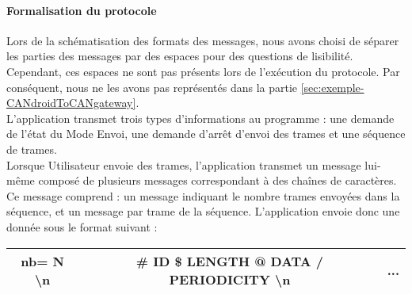 \paragraph{Formalisation du protocole}
\label{sec:formalisation-protocole-CANdroidToCANgateway}

Lors de la schématisation des formats des messages, nous avons choisi de séparer les parties des messages par des espaces pour des questions de lisibilité. Cependant, ces espaces ne sont pas présents lors de l'exécution du protocole. Par conséquent, nous ne les avons pas représentés dans la partie \ref{sec:exemple-CANdroidToCANgateway}.\\

L'application {\nomApplication} transmet trois types d'informations au programme {\nomLogiciel} : une demande de l'état du Mode Envoi, une demande d'arrêt d'envoi des trames et une séquence de trames.\\

Lorsque Utilisateur envoie des trames, l'application {\nomApplication} transmet un message lui-même composé de plusieurs messages correspondant à des chaînes de caractères. Ce message comprend : un message indiquant le nombre trames envoyées dans la séquence, et un message par trame de la séquence. L'application {\nomApplication} envoie donc une donnée sous le format suivant :\\

\begin{minipage}
    \textwidth
    \centering
    \begin{tabular}{|c|c|c|}
        \hline
        nb= N \textbackslash n & \# ID \$ LENGTH @ DATA / PERIODICITY \textbackslash n & ...\\
        \hline
    \end{tabular}
\end{minipage}

\medspace

